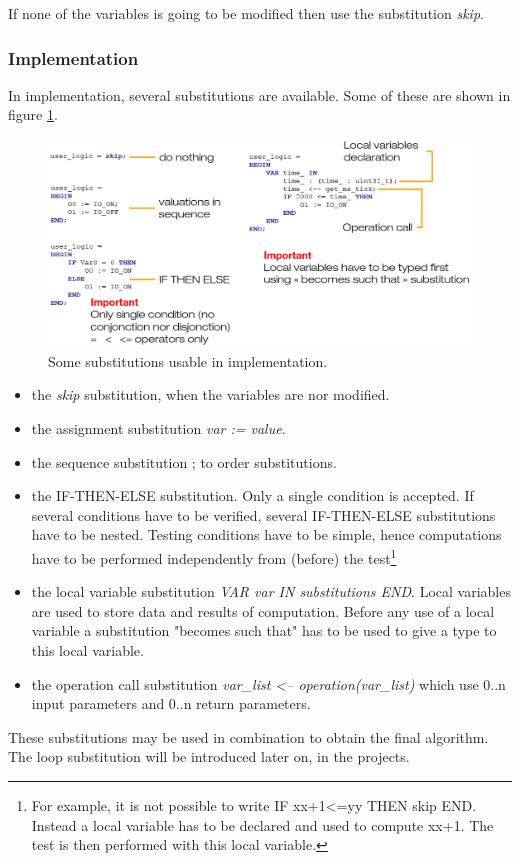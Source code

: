 If none of the variables is going to be modified then use the substitution \textit{skip}.\\

\subsubsection{Implementation}

In implementation, several substitutions are available. Some of these are shown in figure \ref{programming:subst-implem}.

\begin{figure}[ht]
\centering\includegraphics[scale=0.30]{Pictures/chapterProgramming/subst-implem.png}
\caption{Some substitutions usable in implementation. }
\label{programming:subst-implem}
\end{figure}  

\begin{itemize}
    \item the \textit{skip} substitution, when the variables are nor modified.
    \item the assignment substitution \textit{var := value}.
    \item the sequence substitution ; to order substitutions.
    \item the IF-THEN-ELSE substitution. Only a single condition is accepted. If several conditions have to be verified, several IF-THEN-ELSE substitutions have to be nested. Testing conditions have to be simple, hence computations have to be performed independently from (before) the test\footnote{For example, it is not possible to write IF xx+1<=yy THEN skip END. Instead a local variable has to be declared and used to compute xx+1. The test is then performed with this local variable.}
    \item the local variable substitution \textit{VAR var IN substitutions END}. Local variables are used to store data and results of computation. Before any use of a local variable a substitution "becomes such that" has to be used to give a type to this local variable.
    \item the operation call substitution \textit{var\_list <-- operation(var\_list)} which use 0..n input parameters and 0..n return parameters.
\end{itemize}
These substitutions may be used in combination to obtain the final algorithm. The loop substitution will be introduced later on, in the projects.

